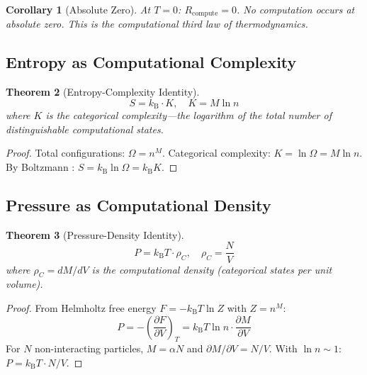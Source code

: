\documentclass[11pt,a4paper]{article}
\newtheorem{theorem}{Theorem}[section]
\newtheorem{corollary}[theorem]{Corollary}
\theoremstyle{definition}
\theoremstyle{remark}
\newcommand{\kB}{k_{\mathrm{B}}}
\begin{document}
\begin{corollary}[Absolute Zero]
At $T = 0$: $R_{\mathrm{compute}} = 0$. No computation occurs at absolute zero. This is the computational third law of thermodynamics.
\end{corollary}

\subsection{Entropy as Computational Complexity}

\begin{theorem}[Entropy-Complexity Identity]
\label{thm:entropy_complexity}
\begin{equation}
S = \kB \cdot K, \quad K = M \ln n
\label{eq:entropy_complexity}
\end{equation}
where $K$ is the \emph{categorical complexity}---the logarithm of the total number of distinguishable computational states.
\end{theorem}

\begin{proof}
Total configurations: $\Omega = n^M$. Categorical complexity: $K = \ln \Omega = M \ln n$. By Boltzmann \citep{boltzmann1877}: $S = \kB \ln \Omega = \kB K$.
\end{proof}

\subsection{Pressure as Computational Density}

\begin{theorem}[Pressure-Density Identity]
\label{thm:pressure}
\begin{equation}
P = \kB T \cdot \rho_C, \quad \rho_C = \frac{N}{V}
\label{eq:pressure_density}
\end{equation}
where $\rho_C = dM/dV$ is the computational density (categorical states per unit volume).
\end{theorem}

\begin{proof}
From Helmholtz free energy $F = -\kB T \ln Z$ with $Z = n^M$:
\begin{equation}
P = -\left(\frac{\partial F}{\partial V}\right)_T = \kB T \ln n \cdot \frac{\partial M}{\partial V}
\end{equation}
For $N$ non-interacting particles, $M = \alpha N$ and $\partial M / \partial V = N/V$. With $\ln n \sim 1$: $P = \kB T \cdot N/V$.
\end{proof}
\end{document}
